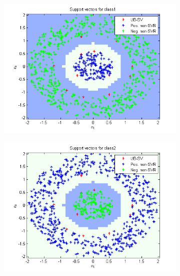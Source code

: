 \documentclass{article}
\begin{document}
\begin{figure}
\begin{subfigure}{.5\textwidth}
  \centering
  \includegraphics[width=.8\linewidth]{Classification/1b/c_g/sv1}
 
\end{subfigure}%
\begin{subfigure}{.5\textwidth}
  \centering
  \includegraphics[width=.8\linewidth]{Classification/1b/c_g/sv2}
  
\end{subfigure}
\end{figure}
\end{document}
